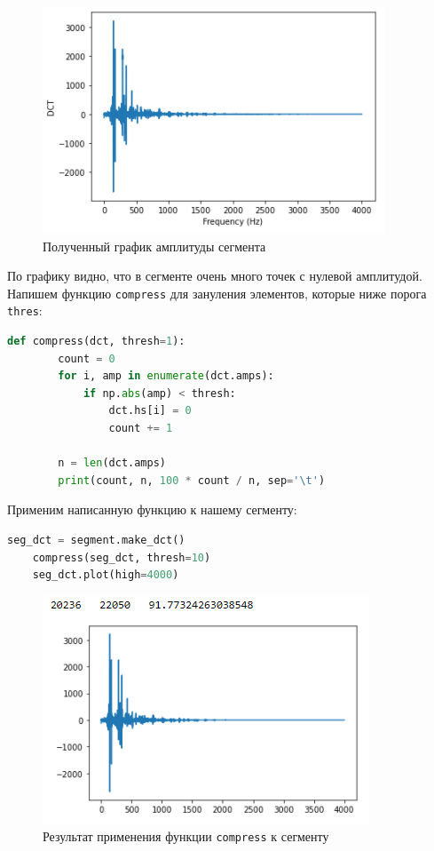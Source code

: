 \documentclass[a4paper]{article}
\begin{document}
            \begin{figure}[H]
                \centering
                \includegraphics{ex_2_segment_dct.png} 
                \caption{Полученный график амплитуды сегмента}
                \label{fig:ex_2_segment_dct}
            \end{figure}
            
            По графику видно, что в сегменте очень много точек с нулевой амплитудой. Напишем функцию \texttt{compress} для зануления элементов, которые ниже порога \texttt{thres}:
            
\begin{lstlisting}[language=Python, caption= Функция \texttt{compress}]
    def compress(dct, thresh=1):
        count = 0
        for i, amp in enumerate(dct.amps):
            if np.abs(amp) < thresh:
                dct.hs[i] = 0
                count += 1
                
        n = len(dct.amps)
        print(count, n, 100 * count / n, sep='\t')
\end{lstlisting}      
            
            Применим написанную функцию к нашему сегменту:
            
\begin{lstlisting}[language=Python, caption= Применение функции \texttt{compress} к сегменту]
    seg_dct = segment.make_dct()
    compress(seg_dct, thresh=10)
    seg_dct.plot(high=4000)
\end{lstlisting}               
            
            \begin{figure}[H]
                \centering
                \includegraphics{ex_2_segment_dct_compress.png} 
                \caption{Результат применения функции \texttt{compress} к сегменту}
                \label{fig:ex_2_segment_dct_compress}
            \end{figure}
            
\end{document}
